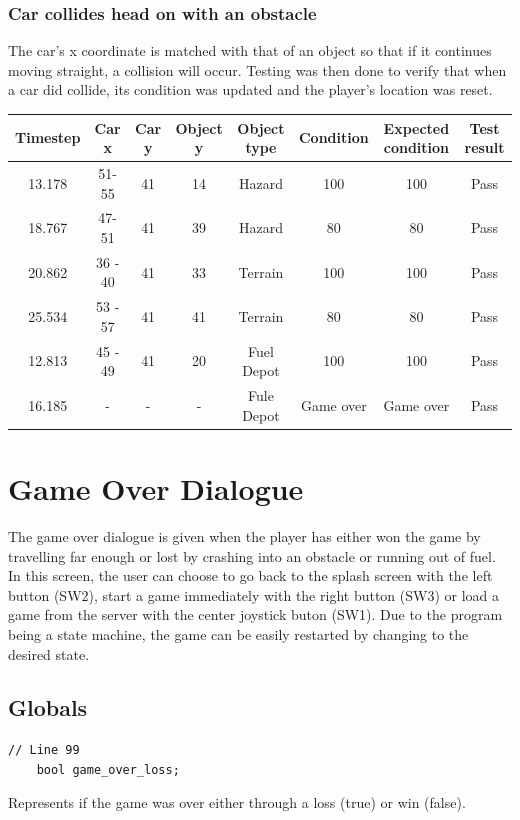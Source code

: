 \documentclass{article}
\begin{document}
\subsubsection*{Car collides head on with an obstacle} 
The car's x coordinate is matched with that of an object so that if it continues moving straight, a collision will occur. Testing was then done to verify that when a car did collide, its condition was updated and the player's location was reset. 
\begin{center}
\begin{tabular}{ c c c c c c c c }
Timestep	& Car x 	& Car y	& Object y	& Object type 	& Condition	& Expected condition	& Test result	\\ \hline
13.178	& 51-55	& 41		& 14		& Hazard		& 100		& 100				& Pass	\\
18.767	& 47-51	& 41		& 39		& Hazard		& 80		& 80				& Pass	\\
20.862	& 36 - 40	& 41		& 33		& Terrain		& 100		& 100				& Pass	\\
25.534	& 53 - 57	& 41		& 41		& Terrain		& 80		& 80				& Pass	\\
12.813	& 45 - 49	& 41		& 20		& Fuel Depot		& 100		& 100				& Pass	\\
16.185	& - 		& - 		& - 		& Fule Depot 	& Game over & Game over			& Pass	\\ \hline
\end{tabular}
\end{center}

\clearpage

\section{Game Over Dialogue}
The game over dialogue is given when the player has either won the game by travelling far enough or lost by crashing into an obstacle or running out of fuel. In this screen, the user can choose to go back to the splash screen with the left button (SW2), start a game immediately with the right button (SW3) or load a game from the server with the center joystick buton (SW1).
\newline
Due to the program being a state machine, the game can be easily restarted by changing to the desired state.

\subsection*{Globals}
\begin{lstlisting}[style=CStyle]
	// Line 99
	bool game_over_loss;
\end{lstlisting}
Represents if the game was over either through a loss (true) or win (false).
\newline
\end{document}
